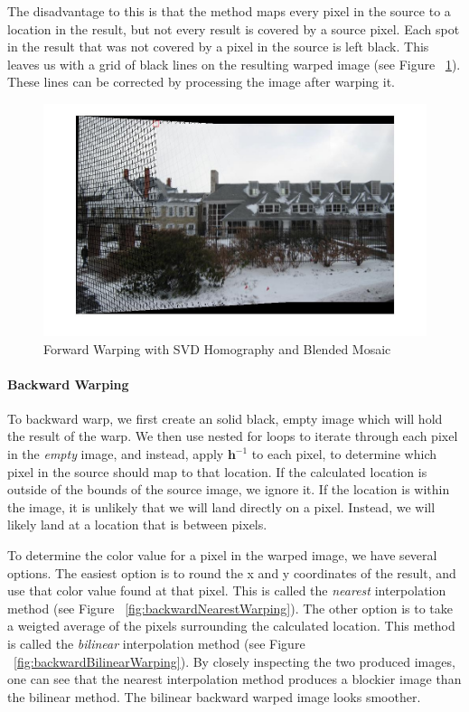 \documentclass[11pt, letterpaper]{article}
\begin{document}
The disadvantage to this is that the method maps every pixel in the
source to a location in the result, but not every result is covered by
a source pixel. Each spot in the result that was not covered by a
pixel in the source is left black. This leaves us with a grid of black
lines on the resulting warped image (see Figure
~\ref{fig:forwardWarping}). These lines can be corrected by processing
the image after warping it.

\begin{figure}[here]
\includegraphics[width=\textwidth]{../pics/snow-svd-forward-blended.jpg}
\caption{Forward Warping with SVD Homography and Blended Mosaic}
\label{fig:forwardWarping}
\end{figure}

\paragraph{Backward Warping}
To backward warp, we first create an solid black, empty image which
will hold the result of the warp. We then use nested for loops to
iterate through each pixel in the \emph{empty} image, and instead,
apply $\mathbf{h}^{-1}$ to each pixel, to determine which pixel in the
source should map to that location. If the calculated location is
outside of the bounds of the source image, we ignore it. If the
location is within the image, it is unlikely that we will land
directly on a pixel. Instead, we will likely land at a location that
is between pixels. 

To determine the color value for a pixel in the warped image, we have
several options. The easiest option is to round the x and
y coordinates of the result, and use that color value found at that pixel. This is called
the \emph{nearest} interpolation method (see Figure
~\ref{fig:backwardNearestWarping}). The other option is to take a
weigted average of the pixels surrounding the calculated
location. This method is called the \emph{bilinear} interpolation
method (see Figure ~\ref{fig:backwardBilinearWarping}). By closely
inspecting the two produced images, one can see that the nearest
interpolation method produces a blockier image than the bilinear
method. The bilinear backward warped image looks smoother.
\end{document}
